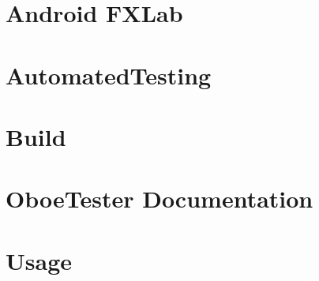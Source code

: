 \let\mypdfximage\pdfximage\def\pdfximage{\immediate\mypdfximage}\documentclass[twoside]{book}
\newcommand{\+}{\discretionary{\mbox{\scriptsize$\hookleftarrow$}}{}{}}
\begin{document}
\chapter{Android F\+X\+Lab}
\label{md__c_1__users_fab_src__github_branches__neural_amp_modeler_plugin_i_plug2__dependencies__build_749e5880e8954201d9e424ac8979f63b}

\chapter{Automated\+Testing}
\label{md__c_1__users_fab_src__github_branches__neural_amp_modeler_plugin_i_plug2__dependencies__build_c8025ea72801fd5141ba31c6e41e248c}

\chapter{Build}
\label{md__c_1__users_fab_src__github_branches__neural_amp_modeler_plugin_i_plug2__dependencies__build_cab4c4b14a57d6e58b76380cd1ba3d49}

\chapter{Oboe\+Tester Documentation}
\label{md__c_1__users_fab_src__github_branches__neural_amp_modeler_plugin_i_plug2__dependencies__build_046f03ffa81aadaa4b6e87d1ca675463}

\chapter{Usage}
\label{md__c_1__users_fab_src__github_branches__neural_amp_modeler_plugin_i_plug2__dependencies__build_6ba0d0c07e24323501990193b4f5ea44}

\end{document}
